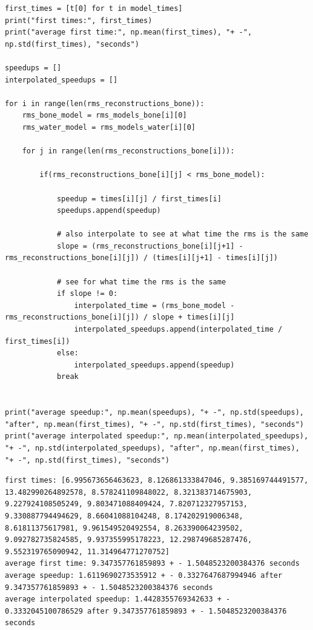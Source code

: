 \begin{verbatim}
first_times = [t[0] for t in model_times]
print("first times:", first_times)
print("average first time:", np.mean(first_times), "+ -", np.std(first_times), "seconds")

speedups = []
interpolated_speedups = []

for i in range(len(rms_reconstructions_bone)):
    rms_bone_model = rms_models_bone[i][0]
    rms_water_model = rms_models_water[i][0]

    for j in range(len(rms_reconstructions_bone[i])):
        
        if(rms_reconstructions_bone[i][j] < rms_bone_model):
            
            speedup = times[i][j] / first_times[i] 
            speedups.append(speedup)

            # also interpolate to see at what time the rms is the same
            slope = (rms_reconstructions_bone[i][j+1] - rms_reconstructions_bone[i][j]) / (times[i][j+1] - times[i][j])
            
            # see for what time the rms is the same
            if slope != 0:
                interpolated_time = (rms_bone_model - rms_reconstructions_bone[i][j]) / slope + times[i][j]
                interpolated_speedups.append(interpolated_time / first_times[i])
            else:
                interpolated_speedups.append(speedup)
            break


print("average speedup:", np.mean(speedups), "+ -", np.std(speedups), "after", np.mean(first_times), "+ -", np.std(first_times), "seconds")
print("average interpolated speedup:", np.mean(interpolated_speedups), "+ -", np.std(interpolated_speedups), "after", np.mean(first_times), "+ -", np.std(first_times), "seconds")
\end{verbatim}

\begin{verbatim}
first times: [6.995673656463623, 8.126861333847046, 9.385169744491577, 13.482990264892578, 8.578241109848022, 8.321383714675903, 9.227924108505249, 9.803471088409424, 7.820712327957153, 9.330887794494629, 8.66041088104248, 8.174202919006348, 8.61811375617981, 9.961549520492554, 8.263390064239502, 9.092782735824585, 9.937355995178223, 12.298749685287476, 9.552319765090942, 11.314964771270752]
average first time: 9.347357761859893 + - 1.5048523200384376 seconds
average speedup: 1.6119690273535912 + - 0.3327647687994946 after 9.347357761859893 + - 1.5048523200384376 seconds
average interpolated speedup: 1.4428355769342633 + - 0.3332045100786529 after 9.347357761859893 + - 1.5048523200384376 seconds
\end{verbatim}

